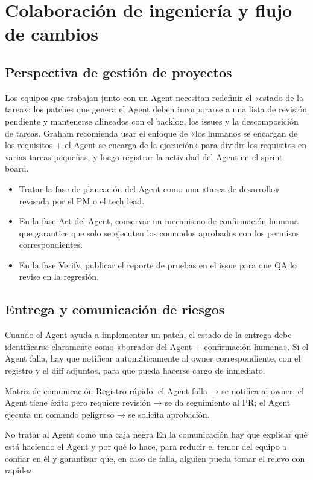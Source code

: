\documentclass[a4paper]{article}
\begin{document}
\section{Colaboración de ingeniería y flujo de cambios}
\subsection{Perspectiva de gestión de proyectos}
Los equipos que trabajan junto con un Agent necesitan redefinir el «estado de la tarea»: los patches que genera el Agent deben incorporarse a una lista de revisión pendiente y mantenerse alineados con el backlog, los issues y la descomposición de tareas. Graham recomienda usar el enfoque de «los humanos se encargan de los requisitos + el Agent se encarga de la ejecución» para dividir los requisitos en varias tareas pequeñas, y luego registrar la actividad del Agent en el sprint board.

\begin{itemize}
    \item Tratar la fase de planeación del Agent como una «tarea de desarrollo» revisada por el PM o el tech lead.
    \item En la fase Act del Agent, conservar un mecanismo de confirmación humana que garantice que solo se ejecuten los comandos aprobados con los permisos correspondientes.
    \item En la fase Verify, publicar el reporte de pruebas en el issue para que QA lo revise en la regresión.
\end{itemize}

\subsection{Entrega y comunicación de riesgos}
Cuando el Agent ayuda a implementar un patch, el estado de la entrega debe identificarse claramente como «borrador del Agent + confirmación humana». Si el Agent falla, hay que notificar automáticamente al owner correspondiente, con el registro y el diff adjuntos, para que pueda hacerse cargo de inmediato.

 \begin{knowledgebox}{Matriz de comunicación}
Registro rápido: el Agent falla → se notifica al owner; el Agent tiene éxito pero requiere revisión → se da seguimiento al PR; el Agent ejecuta un comando peligroso → se solicita aprobación.
\end{knowledgebox}

\begin{warningbox}{No tratar al Agent como una caja negra}
En la comunicación hay que explicar qué está haciendo el Agent y por qué lo hace, para reducir el temor del equipo a confiar en él y garantizar que, en caso de falla, alguien pueda tomar el relevo con rapidez.
\end{warningbox}
\end{document}
